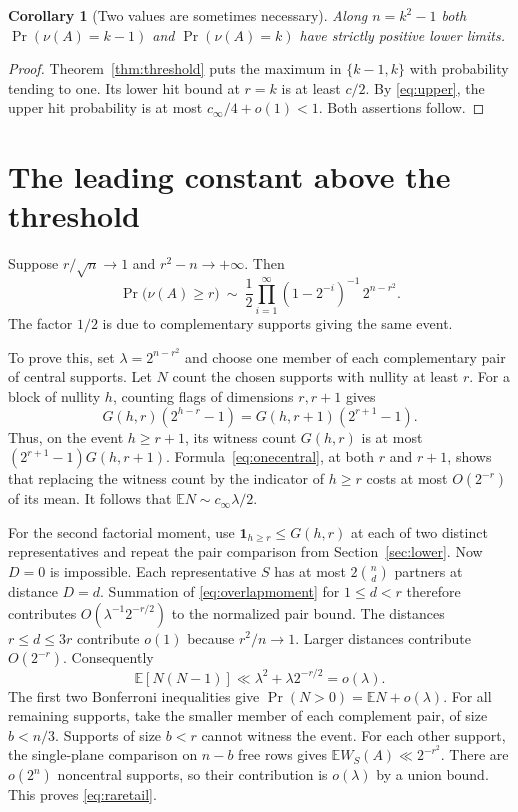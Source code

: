 \documentclass[11pt]{article}
\newtheorem{corollary}[theorem]{Corollary}
\theoremstyle{remark}\newtheorem*{remark}{Remark}
\begin{document}
\begin{corollary}[Two values are sometimes necessary]
Along $n=k^2-1$ both $\Pr(\nu(A)=k-1)$ and $\Pr(\nu(A)=k)$ have strictly positive lower limits.
\end{corollary}
\begin{proof}
Theorem~\ref{thm:threshold} puts the maximum in $\{k-1,k\}$ with probability tending to one. Its lower hit bound at $r=k$ is at least $c/2$. By \eqref{eq:upper}, the upper hit probability is at most $c_\infty/4+o(1)<1$. Both assertions follow.
\end{proof}

\section{The leading constant above the threshold}
\label{sec:raretail}

Suppose $r/\sqrt n\to1$ and $r^2-n\to+\infty$. Then
\begin{equation}\label{eq:raretail}
 \Pr\bigl(\nu(A)\ge r\bigr)
 \ \sim\ \frac12\prod_{i=1}^\infty(1-2^{-i})^{-1}\,2^{n-r^2}.
\end{equation}
The factor $1/2$ is due to complementary supports giving the same event.

To prove this, set $\lambda=2^{n-r^2}$ and choose one member of
each complementary pair of central supports. Let $N$ count the
chosen supports with nullity at least $r$. For a block of nullity
$h$, counting flags of dimensions $r,r+1$ gives
\[
 G(h,r)(2^{h-r}-1)=G(h,r+1)(2^{r+1}-1).
\]
Thus, on the event $h\ge r+1$, its witness count $G(h,r)$ is at most
$(2^{r+1}-1)G(h,r+1)$. Formula~\eqref{eq:onecentral}, at both $r$
and $r+1$, shows that replacing the witness count by the indicator of
$h\ge r$ costs at most $O(2^{-r})$ of its mean. It follows that
$\mathbb E N\sim c_\infty\lambda/2$.

For the second factorial moment, use
$\mathbf 1_{h\ge r}\le G(h,r)$ at each of two distinct representatives
and repeat the pair comparison from Section~\ref{sec:lower}. Now $D=0$
is impossible. Each representative $S$ has at most $2\binom nd$ partners
at distance $D=d$. Summation of \eqref{eq:overlapmoment} for
$1\le d<r$ therefore contributes $O(\lambda^{-1}2^{-r/2})$ to the
normalized pair bound. The distances $r\le d\le3r$ contribute $o(1)$
because $r^2/n\to1$. Larger distances contribute $O(2^{-r})$.
Consequently
\[
 \mathbb E[N(N-1)]\ll \lambda^2+\lambda2^{-r/2}=o(\lambda).
\]
The first two Bonferroni inequalities give
$\Pr(N>0)=\mathbb E N+o(\lambda)$.
For all remaining supports, take the smaller member of each complement
pair, of size $b<n/3$. Supports of size $b<r$ cannot witness the
event. For each other support, the single-plane comparison on $n-b$
free rows gives $\mathbb E W_S(A)\ll 2^{-r^2}$.
There are $o(2^n)$ noncentral supports, so their contribution is
$o(\lambda)$ by a union bound. This proves \eqref{eq:raretail}.
\end{document}
